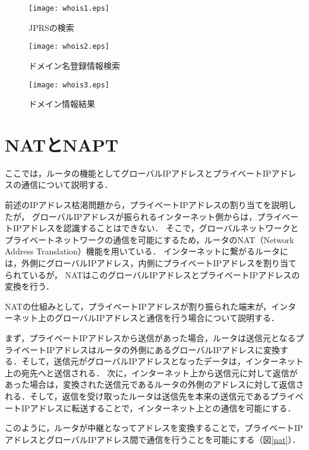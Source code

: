 \begin{figure}[htbp]
 \begin{center}
  \texttt{[image: whois1.eps]}
 \end{center}
 \caption{JPRSの検索}
 \label{whois1}
\end{figure}


\begin{figure}[htbp]
 \begin{center}
  \texttt{[image: whois2.eps]}
 \end{center}
 \caption{ドメイン名登録情報検索}
 \label{whois2}
\end{figure}

\begin{figure}[htbp]
 \begin{center}
  \texttt{[image: whois3.eps]}
 \end{center}
 \caption{ドメイン情報結果}
 \label{whois3}
\end{figure}

\newpage

\section{NATとNAPT}
ここでは，ルータの機能としてグローバルIPアドレスとプライベートIPアドレスの通信について説明する．\par
前述のIPアドレス枯渇問題から，プライベートIPアドレスの割り当てを説明したが，
グローバルIPアドレスが振られるインターネット側からは，プライベートIPアドレスを認識することはできない．
そこで，グローバルネットワークとプライベートネットワークの通信を可能にするため，ルータのNAT（Network Address Translation）機能を用いている．
インターネットに繋がるルータには，外側にグローバルIPアドレス，内側にプライベートIPアドレスを割り当てられているが，
NATはこのグローバルIPアドレスとプライベートIPアドレスの変換を行う．\par
NATの仕組みとして，プライベートIPアドレスが割り振られた端末が，インターネット上のグローバルIPアドレスと通信を行う場合について説明する．\par
まず，プライベートIPアドレスから送信があった場合，ルータは送信元となるプライベートIPアドレスはルータの外側にあるグローバルIPアドレスに変換する．そして，送信元がグローバルIPアドレスとなったデータは，インターネット上の宛先へと送信される．
次に，インターネット上から送信元に対して返信があった場合は，変換された送信元であるルータの外側のアドレスに対して返信される．そして，返信を受け取ったルータは送信先を本来の送信元であるプライベートIPアドレスに転送することで，インターネット上との通信を可能にする．\par
このように，ルータが中継となってアドレスを変換することで，プライベートIPアドレスとグローバルIPアドレス間で通信を行うことを可能にする（図\ref{nat}）．

